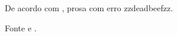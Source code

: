 De acordo com \textcite{zzkeyonlyzz:goto:1974}, prosa com erro zzdeadbeefzz.

Fonte  e \cite{zzkeyonlyzz:1997}.
